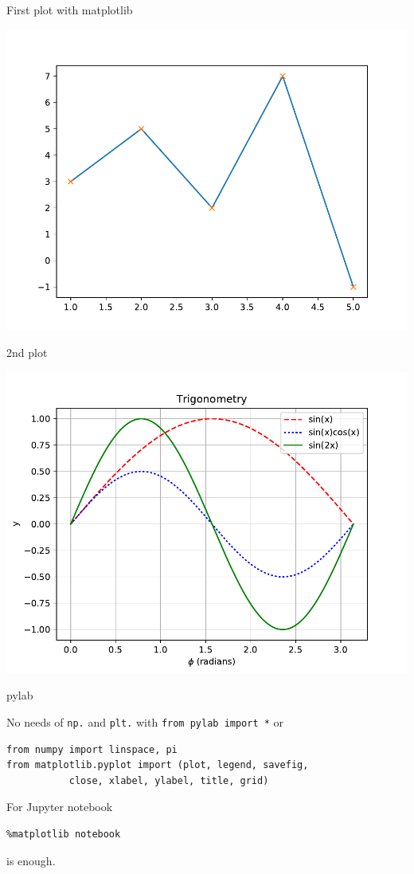 \begin{frame}[fragile]
  {First plot with matplotlib}

\scriptsize
\begin{minipage}[b]{.4\linewidth}
    
\end{minipage}
\quad
\includegraphics[width=.48\textwidth]{codes/visualization/first.pdf}

\end{frame}

\begin{frame}
    {2nd plot}

    \scriptsize


 \includegraphics[width=.48\textwidth]{codes/visualization/trigonometry.pdf}
\end{frame}

\begin{frame}[fragile]
    {pylab}

No needs of \verb+np.+ and \verb+plt.+ with \verb+from pylab import *+ or
\begin{Verbatim}
from numpy import linspace, pi
from matplotlib.pyplot import (plot, legend, savefig,
           close, xlabel, ylabel, title, grid)
\end{Verbatim}

\vfill
For Jupyter notebook

\begin{Verbatim}
%matplotlib notebook
\end{Verbatim}

is enough.
\end{frame}

